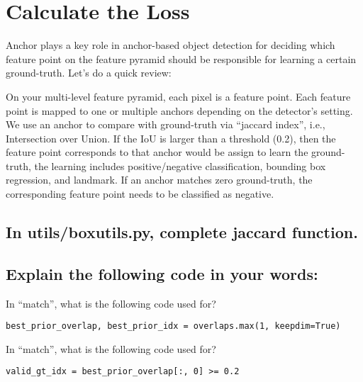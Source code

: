 \documentclass[11pt,addpoints,answers]{exam}
\begin{document}
\begin{solution*}{}

\end{solution*}


\section{Calculate the Loss}

Anchor plays a key role in anchor-based object detection for deciding which feature point
on the feature pyramid should be responsible for learning a certain ground-truth. Let’s do
a quick review:

On your multi-level feature pyramid, each pixel is a feature point. Each feature point is
mapped to one or multiple anchors depending on the detector’s setting. We use an anchor to
compare with ground-truth via “jaccard index”, i.e., Intersection over Union. If the IoU is larger
than a threshold (0.2), then the feature point corresponds to that anchor would be assign to
learn the ground-truth, the learning includes positive/negative classification, bounding box
regression, and landmark. If an anchor matches zero ground-truth, the corresponding feature
point needs to be classified as negative.

\subsection{In utils/boxutils.py, complete jaccard function.}

\subsection{Explain the following code in your words:}

In “match”, what is the following code used for?
\begin{verbatim}
best_prior_overlap, best_prior_idx = overlaps.max(1, keepdim=True)
\end{verbatim}

\begin{solution*}{}

\end{solution*}

In “match”, what is the following code used for?

\begin{verbatim}
valid_gt_idx = best_prior_overlap[:, 0] >= 0.2
\end{verbatim}

\begin{solution*}{}

\end{solution*}
\end{document}
